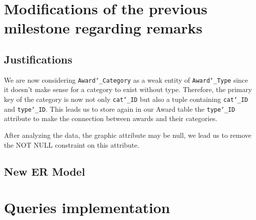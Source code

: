 \documentclass[doubleside, titlepage]{article}
\begin{document}
\section{Modifications of the previous milestone regarding remarks}

\subsection{Justifications}
We are now considering \texttt{Award\char`_Category} as a weak entity of \texttt{Award\char`_Type} since it doesn’t make sense for a category to exist without type. Therefore, the primary key of the category is now not only \texttt{cat\char`_ID} but also a tuple containing \texttt{cat\char`_ID} and \texttt{type\char`_ID}. This leads us to store again in our Award table the \texttt{type\char`_ID} attribute to make the connection between awards and their categories.

After analyzing the data, the graphic attribute may be null, we lead us to remove the NOT NULL constraint on this attribute.


\subsection{New ER Model}
\newpage
\section{Queries implementation}
\end{document}
